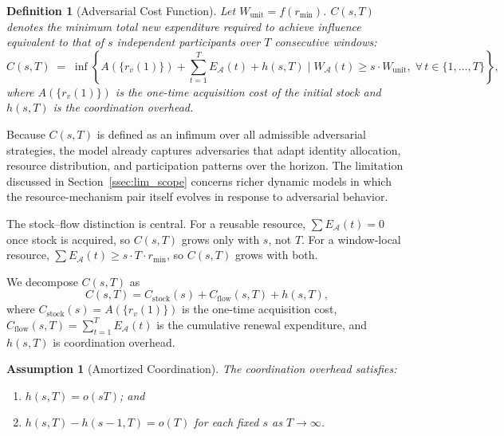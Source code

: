 \documentclass[manuscript,review]{acmart}
\newtheorem{definition}[theorem]{Definition}
\newtheorem{assumption}[theorem]{Assumption}
\theoremstyle{remark}
\begin{document}
	\begin{definition}[Adversarial Cost Function]
		\label{def:cost}
		Let $W_{\mathrm{unit}} = f(r_{\min})$.
		$C(s, T)$ denotes the minimum total \emph{new
			expenditure} required to achieve influence
		equivalent to that of $s$ independent participants
		over $T$ consecutive windows:
		\begin{equation}
			\label{eq:cost}
			C(s, T) \;=\; \inf \left\{
			A\!\left(\{r_v(1)\}\right)
			+ \sum_{t=1}^{T} E_{\mathcal{A}}(t)
			+ h(s,T)
			\;\Bigg|\;
			W_{\mathcal{A}}(t) \geq s \cdot W_{\mathrm{unit}},\;
			\forall\, t \in \{1,\ldots,T\}
			\right\},
		\end{equation}
		where $A(\{r_v(1)\})$ is the one-time acquisition
		cost of the initial stock and $h(s,T)$ is the
		coordination overhead.
	\end{definition}
	
	Because $C(s,T)$ is defined as an infimum over all
	admissible adversarial strategies, the model already
	captures adversaries that adapt identity allocation,
	resource distribution, and participation patterns over
	the horizon.
	The limitation discussed in Section~\ref{ssec:lim_scope}
	concerns richer dynamic models in which the
	resource-mechanism pair itself evolves in response to
	adversarial behavior.
	
	The stock--flow distinction is central.
	For a reusable resource, $\sum E_{\mathcal{A}}(t) = 0$
	once stock is acquired, so $C(s,T)$ grows only with
	$s$, not $T$.
	For a window-local resource,
	$\sum E_{\mathcal{A}}(t) \geq s \cdot T \cdot r_{\min}$,
	so $C(s,T)$ grows with both.
	
	We decompose $C(s,T)$ as
	\begin{equation}
		C(s, T) = C_{\mathrm{stock}}(s)
		+ C_{\mathrm{flow}}(s, T)
		+ h(s, T),
	\end{equation}
	where $C_{\mathrm{stock}}(s) = A(\{r_v(1)\})$
	is the one-time acquisition cost,
	$C_{\mathrm{flow}}(s,T) = \sum_{t=1}^{T} E_{\mathcal{A}}(t)$
	is the cumulative renewal expenditure, and $h(s,T)$
	is coordination overhead.
	
	\begin{assumption}[Amortized Coordination]
		\label{asm:coordination}
		The coordination overhead satisfies:
		\begin{enumerate}
			\item[(a)] $h(s, T) = o(sT)$; and
			\item[(b)] $h(s, T) - h(s-1, T) = o(T)$
			for each fixed $s$ as $T \to \infty$.
		\end{enumerate}
	\end{assumption}
	
\end{document}
